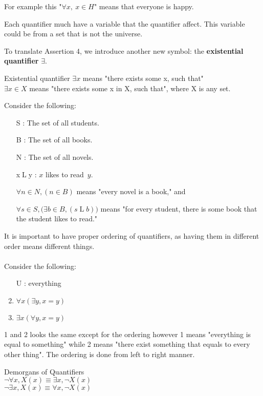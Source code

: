 \documentclass[../MATH-2000-Notes.tex]{subfiles}
\begin{document}
    For example this "\(\forall x,\ x\in H\)" means that everyone is happy.
\begin{Note}
    Each quantifier much have a variable that the quantifier affect. This variable could be from a set that is not the universe.
\end{Note}
To translate Assertion 4, we introduce another new symbol: the \textbf{existential quantifier} \(\exists\).
\begin{Definition}
    {Existential quantifier}
    \(\exists x\) means "there exists some x, such that"\\
    \(\exists x \in X\) means "there exists some x in X, such that", where X is any set.
\end{Definition}
\newpage
Consider the following:
\begin{itemize}
    \item[S]:  The set of all students.
    \item[B]: The set of all books.
    \item[N]: The set of all novels.
    \item[x$\mathrel{L}$y]: $x$ likes to read~$y$.
\end{itemize}
\begin{itemize}
    \item[] $\forall n \in N, (n \in B)$ means "every novel is a book\rlap,"
    and
    \item[] $\forall s \in S, \bigl( \exists b \in B, (s  \mathrel{L} b) \bigr)$ means "for every student, there is some book that the student likes to read\rlap."
\end{itemize}
It is important to have proper ordering of quantifiers, as having them in different order means different things.
\\~\\
Consider the following:
\begin{enumerate}
    \item [U]: everything
    \item \(\forall x(\exists y, x = y)\)
    \item \(\exists x (\forall y, x = y)\)
\end{enumerate}
1 and 2 looks the same except for the ordering however 1 means "everything is equal to something" while 2 means "there exist something that equals to every other thing". The ordering is done from left to right manner.
\begin{Theorem}
    {Demorgans of Quantifiers}~\\
    \(\neg \forall x, X(x) \equiv \exists x, \neg X(x)\)\\
    \(\neg \exists x, X(x) \equiv \forall x, \neg X(x)\)
\end{Theorem}
\end{document}
